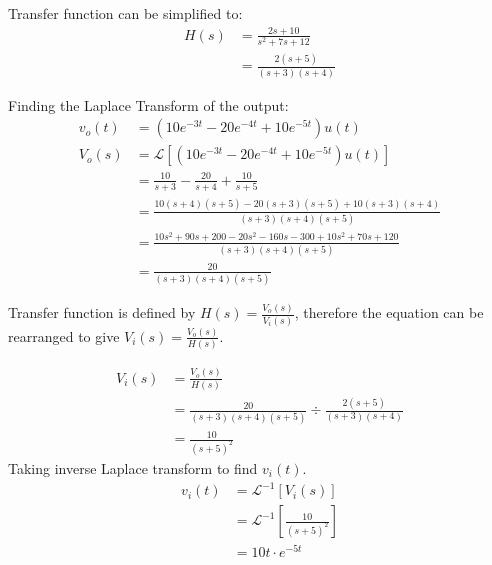 
Transfer function can be simplified to:
\begin{align*}
H(s) &= \frac{2s + 10}{s^2 + 7s + 12}\\
&= \frac{2(s+5)}{(s+3)(s+4)}
\end{align*}

Finding the Laplace Transform of the output:
\begin{align*}
v_o(t) &= (10e^{-3t} - 20e^{-4t} + 10e^{-5t})u(t)\\
V_o(s) &= \mathcal{L}[(10e^{-3t} - 20e^{-4t} + 10e^{-5t})u(t)]\\
&= \frac{10}{s+3} - \frac{20}{s + 4} + \frac{10}{s+5}\\
&= \frac{10(s+4)(s+5) - 20(s+3)(s+5) + 
10(s+3)(s+4)}{(s+3)(s+4)(s+5)}\\
&= \frac{10s^2 + 90s + 200 - 20s^2 - 160s - 300 + 10s^2 + 
70s + 120}{(s+3)(s+4)(s+5)}\\
&= \frac{20}{(s+3)(s+4)(s+5)}
\end{align*}

Transfer function is defined by $H(s) = \frac{V_o(s)}{V_i(s)}$, 
therefore the equation can be rearranged to give 
$ V_i(s) = \frac{V_o(s)}{H(s)} $.

\begin{align*}
V_i(s) &=  \frac{V_o(s)}{H(s)}\\
&= \frac{20}{(s+3)(s+4)(s+5)} \div \frac{2(s+5)}{(s+3)(s+4)}\\
&= \frac{10}{(s+5)^2}
\end{align*}
Taking inverse Laplace transform to find $v_i(t)$.
\begin{align*}
v_i(t) &= \mathcal{L}^{-1} [V_i(s)]\\
&= \mathcal{L}^{-1} [\frac{10}{(s+5)^2}]\\
&= 10t \cdot e^{-5t}
\end{align*}